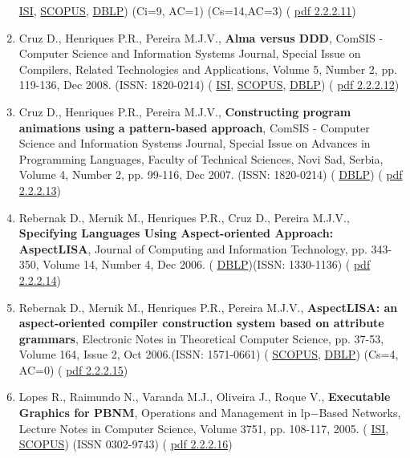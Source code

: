\documentclass[11pt]{article}
\begin{document}
\begin{enumerate}
{\href{run:Publicacoes/ComprovativosISI.pdf}{ISI}, 
\href{run:Publicacoes/PublicacoesSCOPUS.pdf}{SCOPUS}, 
\href{run:Publicacoes/ComprovativosDBLP.pdf}{DBLP}) (Ci=9, AC=1) (Cs=14,AC=3) (
\href{run:Publicacoes/publicacoes/33.pdf}{pdf 2.2.2.11})}
\item{ Cruz D., Henriques P.R., Pereira M.J.V., {
\bf{ Alma versus DDD}}, ComSIS - Computer Science and Information Systems Journal, Special Issue on Compilers, Related Technologies and Applications, Volume 5, Number 2, pp. 119-136, Dec 2008. (ISSN: 1820-0214) (
\href{run:Publicacoes/ComprovativosISI.pdf}{ISI}, 
\href{run:Publicacoes/PublicacoesSCOPUS.pdf}{SCOPUS}, 
\href{run:Publicacoes/ComprovativosDBLP.pdf}{DBLP}) (
\href{run:Publicacoes/publicacoes/34.pdf}{pdf 2.2.2.12})}
\item{ Cruz D., Henriques P.R., Pereira M.J.V., {
\bf{ Constructing program animations using a pattern-based approach}}, ComSIS - Computer Science and Information Systems Journal, Special Issue on Advances in Programming Languages, Faculty of Technical Sciences, Novi Sad, Serbia, Volume 4, Number 2, pp. 99-116, Dec 2007. (ISSN: 1820-0214) (
\href{run:Publicacoes/ComprovativosDBLP.pdf}{DBLP}) (
\href{run:Publicacoes/publicacoes/25.pdf}{pdf 2.2.2.13})}
\item{ Rebernak D., Mernik M., Henriques P.R., Cruz D., Pereira M.J.V., {
\bf{ Specifying Languages Using Aspect-oriented Approach: AspectLISA}}, Journal of Computing and Information Technology, pp. 343-350, Volume 14, Number 4, Dec 2006. (
\href{run:Publicacoes/ComprovativosDBLP.pdf}{DBLP})(ISSN: 1330-1136) (
\href{run:Publicacoes/publicacoes/20.pdf}{pdf 2.2.2.14})}
\item{ Rebernak D., Mernik M., Henriques P.R., Pereira M.J.V., {
\bf{ AspectLISA: an aspect-oriented compiler construction system based on attribute grammars}}, Electronic Notes in Theoretical Computer Science, pp. 37-53, Volume 164, Issue 2, Oct 2006.(ISSN: 1571-0661) (
\href{run:Publicacoes/PublicacoesSCOPUS.pdf}{SCOPUS}, 
\href{run:Publicacoes/ComprovativosDBLP.pdf}{DBLP}) (Cs=4, AC=0) (
\href{run:Publicacoes/publicacoes/14.pdf}{pdf 2.2.2.15})}
\item{ Lopes R., Raimundo N., Varanda M.J., Oliveira J., Roque V., {
\bf{ Executable Graphics for PBNM}}, Operations and Management in lp$-$Based Networks, Lecture Notes in Computer Science, Volume 3751, pp. 108-117, 2005. (
\href{run:Publicacoes/ComprovativosISI.pdf}{ISI}, 
\href{run:Publicacoes/PublicacoesSCOPUS.pdf}{SCOPUS}) (ISSN 0302-9743) (
\href{run:Publicacoes/publicacoes/83.pdf}{pdf 2.2.2.16})}

\end{enumerate}
\end{document}
